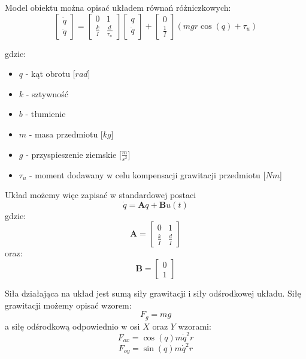\documentclass[12pt,a4paper]{article}
\begin{document}
	Model obiektu można opisać układem równań różniczkowych:
	\label{eq:intro2}
	\begin{equation}
	\begin{bmatrix}
	\dot{q} \\
	\ddot{q}
	\end{bmatrix}
	=
	\begin{bmatrix}
	0 & 1 \\
	\frac{k}{I} & \frac{d}{\tau_u}
	\end{bmatrix}
	\begin{bmatrix}
	q \\
	\dot{q}
	\end{bmatrix}
	+
	\begin{bmatrix}
	0 \\
	\frac{1}{I}
	\end{bmatrix}
	(mgr\cos{(q)} + \tau_u)
	\end{equation}
	
	gdzie:
	\begin{itemize}
		\item $q$ - kąt obrotu [$rad$]
		\item $k$ - sztywność
		\item $b$ - tłumienie
		\item $m$ - masa przedmiotu [$kg$]
		\item $g$ - przyspieszenie ziemskie [$\frac{m}{s^2}$]
		\item $\tau_u$ - moment dodawany w celu kompensacji grawitacji przedmiotu [$Nm$]
	\end{itemize}
	
	Układ możemy więc zapisać w standardowej postaci
	\begin{equation}
	\dot{q} = \textbf{A}q + \textbf{B}u(t)
	\end{equation}
	gdzie:
	\begin{equation}
	\mathbf{A} = 	\begin{bmatrix}
	0 & 1 \\
	\frac{k}{I} & \frac{d}{I}
	\end{bmatrix}
	\end{equation}
	oraz:
	\begin{equation}
	\mathbf{B} = \begin{bmatrix}
	0 \\
	1
	\end{bmatrix}
	\end{equation}
	
	Siła działająca na układ jest sumą siły grawitacji i siły odśrodkowej układu.
	Siłę grawitacji możemy opisać wzorem:
	\begin{equation}
	F_g = mg
	\end{equation}
	a siłę odśrodkową odpowiednio w osi $X$ oraz $Y$ wzorami:
	\begin{equation}
	F_{ox} =  \cos{(q)}m\dot{q}^2 r
	\end{equation}
	\begin{equation}
	F_{oy} =  \sin{(q)}m\dot{q}^2 r
	\end{equation}
	
\end{document}
